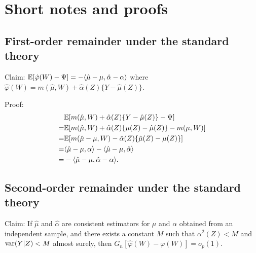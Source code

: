 \section{Short notes and proofs}

\subsection{First-order remainder under the standard theory}
\label{proof:first-order}
Claim: $\mathbb{E}[\hat{\varphi}(W) - \Psi] = -\langle \hat{\mu} - \mu, \hat{\alpha} - \alpha \rangle$ where $\hat{\varphi}(W) = m(\hat{\mu}, W) + \hat{\alpha}(Z)\{Y - \hat{\mu}(Z)\}$.

Proof:
\begin{align*}
    & \mathbb{E}[ m(\hat{\mu}, W) + \hat{\alpha}(Z)\{Y - \hat{\mu}(Z)\}  - \Psi ] \\
    = & \mathbb{E}[ m(\hat{\mu}, W) + \hat{\alpha}(Z)\{\mu(Z) - \hat{\mu}(Z)\}  - m(\mu, W) ] \\
    = & \mathbb{E}[ m(\hat{\mu} - \mu, W) - \hat{\alpha}(Z)\{ \hat{\mu}(Z) - \mu(Z)\} ] \\
    = & \langle \hat{\mu} - \mu, \alpha \rangle - \langle \hat{\mu} - \mu, \hat{\alpha} \rangle  \\
    = & -\langle \hat{\mu} - \mu, \hat{\alpha} - \alpha \rangle.
\end{align*}

\subsection{Second-order remainder under the standard theory}
Claim: If $\hat{\mu}$ and $\hat{\alpha}$ are consistent estimators for $\mu$ and $\alpha$ obtained from an independent sample, and there exists a constant $M$ such that $\alpha^2(Z) < M$ and $\mathrm{var}(Y|Z) < M$ almost surely, then $G_n[\hat{\varphi}(W) - \varphi(W)] = o_p(1)$.


